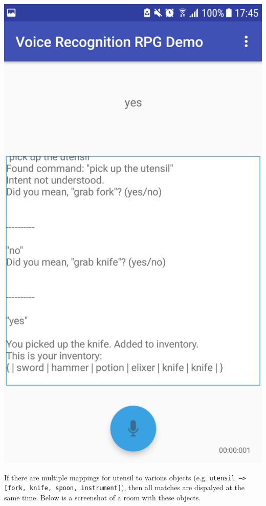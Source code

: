 \documentclass[11pt]{article}
\begin{document}
\begin{appendices}
\begin{center}
\includegraphics[scale=0.18]{utensil-2.png}
\end{center}

\newpage
If there are multiple mappings for utensil to various objects (e.g. \texttt{utensil --> [fork, knife, spoon, instrument]}), then all matches are dispalyed at the same time. Below is a screenshot of a room with these objects.


\end{appendices}
\end{document}
